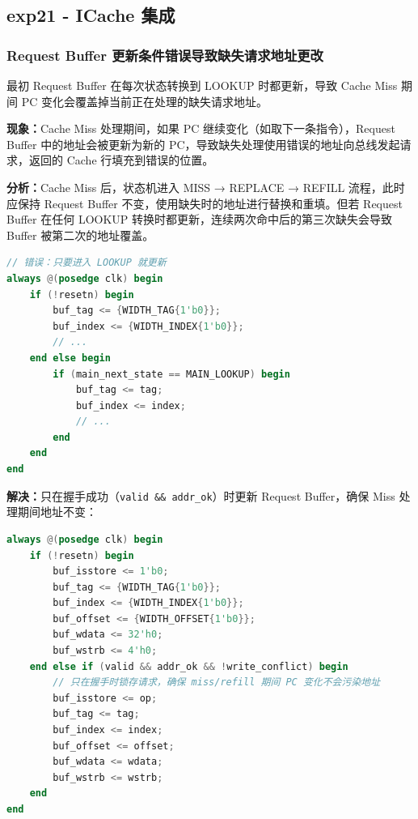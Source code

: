 \subsection{exp21 - ICache 集成}

\subsubsection{Request Buffer 更新条件错误导致缺失请求地址更改}

最初 Request Buffer 在每次状态转换到 LOOKUP 时都更新，导致 Cache Miss 期间 PC 变化会覆盖掉当前正在处理的缺失请求地址。

\noindent
\textbf{现象：}Cache Miss 处理期间，如果 PC 继续变化（如取下一条指令），Request Buffer 中的地址会被更新为新的 PC，导致缺失处理使用错误的地址向总线发起请求，返回的 Cache 行填充到错误的位置。

\noindent
\textbf{分析：}Cache Miss 后，状态机进入 MISS → REPLACE → REFILL 流程，此时应保持 Request Buffer 不变，使用缺失时的地址进行替换和重填。但若 Request Buffer 在任何 LOOKUP 转换时都更新，连续两次命中后的第三次缺失会导致 Buffer 被第二次的地址覆盖。

\begin{lstlisting}[language=Verilog, caption=错误的 Buffer 更新条件]
// 错误：只要进入 LOOKUP 就更新
always @(posedge clk) begin
    if (!resetn) begin
        buf_tag <= {WIDTH_TAG{1'b0}};
        buf_index <= {WIDTH_INDEX{1'b0}};
        // ...
    end else begin
        if (main_next_state == MAIN_LOOKUP) begin
            buf_tag <= tag;
            buf_index <= index;
            // ...
        end
    end
end
\end{lstlisting}

\noindent
\textbf{解决：}只在握手成功（\verb|valid && addr_ok|）时更新 Request Buffer，确保 Miss 处理期间地址不变：

\begin{lstlisting}[language=Verilog, caption=正确的 Buffer 更新条件]
always @(posedge clk) begin
    if (!resetn) begin
        buf_isstore <= 1'b0;
        buf_tag <= {WIDTH_TAG{1'b0}};
        buf_index <= {WIDTH_INDEX{1'b0}};
        buf_offset <= {WIDTH_OFFSET{1'b0}};
        buf_wdata <= 32'h0;
        buf_wstrb <= 4'h0;
    end else if (valid && addr_ok && !write_conflict) begin
        // 只在握手时锁存请求，确保 miss/refill 期间 PC 变化不会污染地址
        buf_isstore <= op;
        buf_tag <= tag;
        buf_index <= index;
        buf_offset <= offset;
        buf_wdata <= wdata;
        buf_wstrb <= wstrb;
    end
end
\end{lstlisting}

